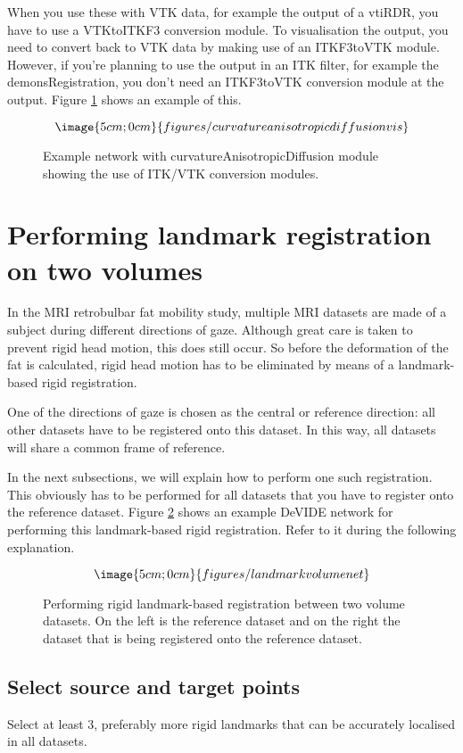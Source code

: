 When you use these with VTK data, for example the output of a vtiRDR,
you have to use a VTKtoITKF3 conversion module.  To visualisation the
output, you need to convert back to VTK data by making use of an
ITKF3toVTK module.  However, if you're planning to use the output in
an ITK filter, for example the demonsRegistration, you don't need an
ITKF3toVTK conversion module at the output.  Figure \ref{figCADvis}
shows an example of this.

\begin{figure}
$$\image{5cm;0cm}{figures/curvatureanisotropicdiffusionvis}$$
\caption{Example network with curvatureAnisotropicDiffusion module
showing the use of ITK/VTK conversion modules.}\label{figCADvis}
\end{figure}
\section{Performing landmark registration on two volumes}
In the MRI retrobulbar fat mobility study, multiple MRI datasets are
made of a subject during different directions of gaze.  Although great
care is taken to prevent rigid head motion, this does still occur.  So
before the deformation of the fat is calculated, rigid head motion has
to be eliminated by means of a landmark-based rigid registration.

One of the directions of gaze is chosen as the central or reference
direction: all other datasets have to be registered onto this dataset.
In this way, all datasets will share a common frame of reference.

In the next subsections, we will explain how to perform one such
registration.  This obviously has to be performed for all datasets
that you have to register onto the reference dataset.  Figure
\ref{figLMVN} shows an example DeVIDE network for performing this
landmark-based rigid registration.  Refer to it during the following
explanation.

\begin{figure}
$$\image{5cm;0cm}{figures/landmarkvolumenet}$$
\caption{Performing rigid landmark-based registration between two volume 
datasets.  On the left is the reference dataset and on the right the 
dataset that is being registered onto the reference dataset.}\label{figLMVN}
\end{figure}

\subsection{Select source and target points}
Select at least 3, preferably more rigid landmarks that can be
accurately localised in all datasets.

